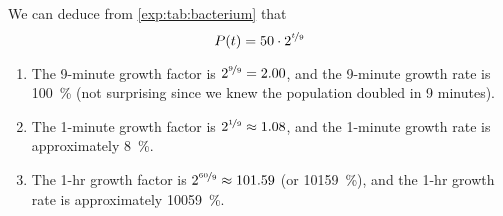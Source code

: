 \begin{pccexample}
\begin{pccsolution}
		We can deduce from \cref{exp:tab:bacterium} that 
		\[
			P(t) = 50\cdot 2^{\nicefrac{t}{9}}
		\]
		\begin{enumerate}
			\item The 9-minute growth factor is $2^{\nicefrac{9}{9}} = 2.00$, and the 9-minute growth rate is \SI{100}{\percent} (not surprising since 
			we knew the population doubled in 9 minutes).
			\item The 1-minute growth factor is $2^{\nicefrac{1}{9}}\approx 1.08$, and the 1-minute growth rate is approximately \SI{8}{\percent}.
			\item The 1-hr growth factor is $2^{\nicefrac{60}{9}}\approx 101.59$ (or \SI{10159}{\percent}), and the 1-hr growth rate is approximately \SI{10059}{\percent}.
		\end{enumerate}
	\end{pccsolution}
\end{pccexample}

